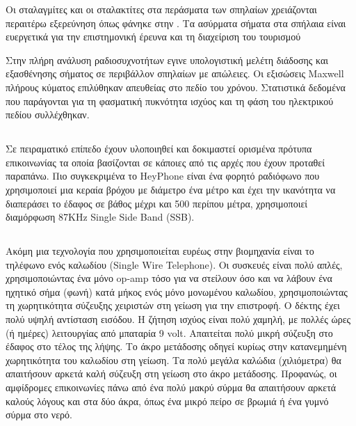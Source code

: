 \documentclass[12pt, greek]{article}
\begin{document}
\begin{multicols*}{2}
        Οι σταλαγμίτες και οι σταλακτίτες στα περάσματα των σπηλαίων χρειάζονται περαιτέρω
        εξερεύνηση όπως φάνηκε στην \cite{soo_propagation_2018}.
        Τα ασύρματα σήματα στα σπήλαια είναι ευεργετικά για την επιστημονική έρευνα και τη 
        διαχείριση του τουρισμού

        Στην πλήρη ανάλυση ραδιοσυχνοτήτων \cite{pingenot_full_2005} εγινε υπολογιστική μελέτη
        διάδοσης και εξασθένησης σήματος σε περιβάλλον σπηλαίων με απώλειες. Οι εξισώσεις Maxwell
        πλήρους κύματος επιλύθηκαν απευθείας στο πεδίο του χρόνου. Στατιστικά δεδομένα που παράγονται
        για τη φασματική πυκνότητα ισχύος και τη φάση του ηλεκτρικού πεδίου συλλέχθηκαν.

    \subsection{}
        Σε πειραματικό επίπεδο έχουν υλοποιηθεί και δοκιμαστεί ορισμένα πρότυπα επικοινωνίας
        τα οποία βασίζονται σε κάποιες από τις αρχές που έχουν προταθεί παραπάνω. Πιο
        συγκεκριμένα το HeyPhone είναι ένα φορητό ραδιόφωνο που χρησιμοποιεί μια κεραία βρόχου
        με διάμετρο ένα μέτρο και έχει την ικανότητα να διαπεράσει το έδαφος σε βάθος μέχρι
        και 500 περίπου μέτρα, χρησιμοποιεί διαμόρφωση 87KHz Single Side Band (SSB).

    \subsection{}
        Ακόμη μια τεχνολογία που χρησιμοποιείται ευρέως στην βιομηχανία είναι το τηλέφωνο
        ενός καλωδίου (Single Wire Telephone). Οι συσκευές είναι πολύ απλές, χρησιμοποιώντας
        ένα μόνο op-amp τόσο για να στείλουν όσο και να λάβουν ένα ηχητικό σήμα (φωνή) κατά
        μήκος ενός μόνο μονωμένου καλωδίου, χρησιμοποιώντας τη χωρητικότητα σύζευξης χειριστών
        στη γείωση για την επιστροφή. Ο δέκτης έχει πολύ υψηλή αντίσταση εισόδου. Η ζήτηση
        ισχύος είναι πολύ χαμηλή, με πολλές ώρες (ή ημέρες) λειτουργίας από μπαταρία 9 volt.
        Απαιτείται πολύ μικρή σύζευξη στο έδαφος στο τέλος της λήψης. Το άκρο μετάδοσης οδηγεί
        κυρίως στην κατανεμημένη χωρητικότητα του καλωδίου στη γείωση. Τα πολύ μεγάλα καλώδια
        (χιλιόμετρα) θα απαιτήσουν αρκετά καλή σύζευξη στη γείωση στο άκρο μετάδοσης.
        Προφανώς, οι αμφίδρομες επικοινωνίες πάνω από ένα πολύ μακρύ σύρμα θα απαιτήσουν
        αρκετά καλούς λόγους και στα δύο άκρα, όπως ένα μικρό πείρο σε βρωμιά ή ένα γυμνό
        σύρμα στο νερό.

    \printbibliography
\end{multicols*}
\end{document}
